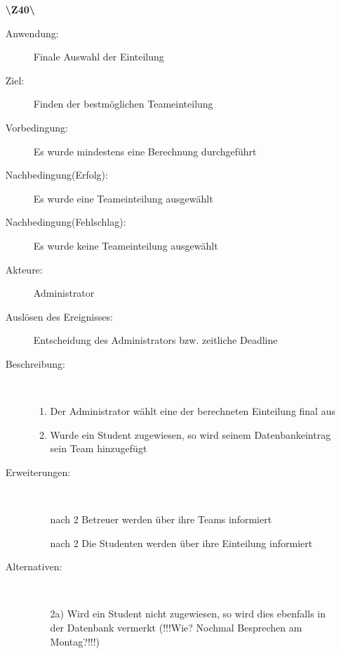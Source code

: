 \documentclass[a4paper]{article}
\begin{document}
\begin{enumerate}
  \item[\textbf{\textbackslash Z40\textbackslash}] \begin{description}
  \item[Anwendung:] Finale Auswahl der Einteilung
  \item[Ziel:] Finden der bestmöglichen Teameinteilung
  	\item[Vorbedingung:] Es wurde mindestens eine Berechnung durchgeführt
  	\item[Nachbedingung(Erfolg):] Es wurde eine Teameinteilung ausgewählt
  	\item[Nachbedingung(Fehlschlag):] Es wurde keine Teameinteilung ausgewählt
  	\item[Akteure:] Administrator
  	\item[Auslösen des Ereignisses:] Entscheidung des Administrators bzw.
  	zeitliche Deadline
  	\item[Beschreibung:]~
  	\begin{enumerate}[1.]
  	  \item Der Administrator wählt eine der berechneten Einteilung final aus
  	  \item Wurde ein Student zugewiesen, so wird seinem Datenbankeintrag sein
  	  Team hinzugefügt
  	\end{enumerate}
  	\item[Erweiterungen:]~
  	\begin{enumerate}
  	  \item[nach 2] Betreuer werden über ihre Teams informiert
  	  \item[nach 2] Die Studenten werden über ihre Einteilung informiert
  	 \end{enumerate}
  	\item[Alternativen:] ~
  	\begin{enumerate}
  	  \item[2a)] Wird ein Student nicht zugewiesen, so wird dies ebenfalls in der
  	  Datenbank vermerkt (!!!Wie? Nochmal Besprechen am Montag?!!!)
  	 \end{enumerate}  
  \end{description}
  \pagebreak
  

\end{enumerate}
\end{document}
